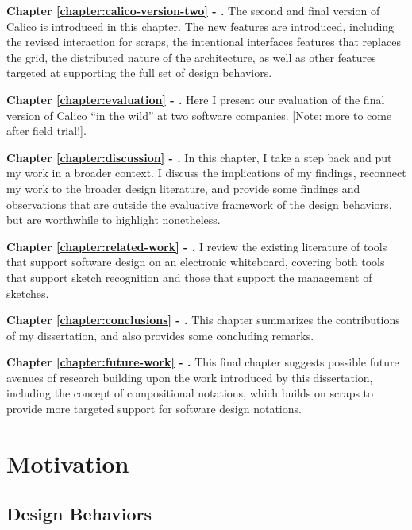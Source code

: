 \documentclass[12pt,fleqn]{ucithesis}
\begin{document}
\textbf{Chapter \ref{chapter:calico-version-two} - .} The second and final version of Calico is introduced in this chapter. The new features are introduced, including the revised interaction for scraps, the intentional interfaces features that replaces the grid, the distributed nature of the architecture, as well as other features targeted at supporting the full set of design behaviors.

\textbf{Chapter \ref{chapter:evaluation} - .} Here I present our evaluation of the final version of Calico ``in the wild'' at two software companies. [Note: more to come after field trial!].

\textbf{Chapter \ref{chapter:discussion} - .} In this chapter, I take a step back and put my work in a broader context. I discuss the implications of my findings, reconnect my work to the broader design literature, and provide some findings and observations that are outside the evaluative framework of the design behaviors, but are worthwhile to highlight nonetheless. 

\textbf{Chapter \ref{chapter:related-work} - .} I review the existing literature of tools that support software design on an electronic whiteboard, covering both tools that support sketch recognition and those that support the management of sketches.

\textbf{Chapter \ref{chapter:conclusions} - .} This chapter summarizes the contributions of my dissertation, and also provides some concluding remarks.

\textbf{Chapter \ref{chapter:future-work} - .} This final chapter suggests possible future avenues of research building upon the work introduced by this dissertation, including the concept of compositional notations, which builds on scraps to provide more targeted support for software design notations.

 \newpage 
 \newpage \chapter{Motivation}
\label{chapter:motivation}

\section{Design Behaviors}
\end{document}
